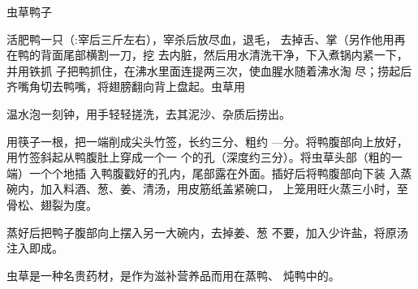 \begin{recipe}{虫草鸭子}

\ingredients


\cooking

\step 活肥鸭一只（:宰后三斤左右），宰杀后放尽血，退毛， 去掉舌、掌（另作他用再在鸭的背面尾部横割一刀，挖 去内脏，然后用水清洗干净，下入煮锅内紧一下，并用铁抓 子把鸭抓住，在沸水里面连提两三次，使血腥水随着沸水淘 尽；捞起后齐嘴角切去鸭嘴，将翅膀翻向背上盘起。虫草用

温水泡一刻钟，用手轻轻搓洗，去其泥沙、杂质后捞出。

用筷子一根，把一端削成尖头竹签，长约三分、粗约 —分。将鸭腹部向上放好，用竹签斜起从鸭腹肚上穿成一个一 个的孔（深度约三分）。将虫草头部（粗的一端）一个个地插 入鸭腹戳好的孔内，尾部露在外面。插好后将鸭腹部向下装 入蒸碗内，加入料酒、葱、姜、清汤，用皮筋纸盖紧碗口， 上笼用旺火蒸三小时，至骨松、翅裂为度。

\step 蒸好后把鸭子腹部向上摆入另一大碗内，去掉姜、葱 不要，加入少许盐，将原汤注入即成。

\notes

虫草是一种名贵药材，是作为滋补营养品而用在蒸鸭、 炖鸭中的。

\end{recipe}

